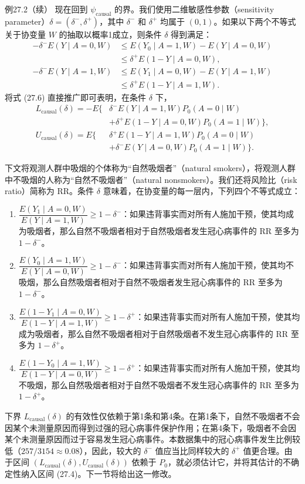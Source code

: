\begin{bookresult}{例}{27.2（续）}
现在回到 $\psi_{\mathrm{causal}}$ 的界。我们使用二维敏感性参数（sensitivity parameter）$\delta=(\delta^-,\delta^+)$，其中 $\delta^-$ 和 $\delta^+$ 均属于 $(0,1)$。如果以下两个不等式关于协变量 $W$ 的抽取以概率1成立，则条件 $\delta$ 得到满足：
\[
 \begin{aligned}
 -\delta^-E(Y\mid A=0,W)
 &\leq E(Y_0\mid A=1,W)-E(Y\mid A=0,W)\\
 &\leq\delta^+E(1-Y\mid A=0,W),\\[2pt]
 -\delta^-E(Y\mid A=1,W)
 &\leq E(Y_1\mid A=0,W)-E(Y\mid A=1,W)\\
 &\leq\delta^+E(1-Y\mid A=1,W).
 \end{aligned}
\]
将式 (27.6) 直接推广即可表明，在条件 $\delta$ 下，
\begin{equation}
 \begin{aligned}
 L_{\mathrm{causal}}(\delta)=-E\bigl\{&\delta^-E(Y\mid A=1,W)P_0(A=0\mid W)\\
 &+\delta^+E(1-Y\mid A=0,W)P_0(A=1\mid W)\bigr\},\\
 U_{\mathrm{causal}}(\delta)=E\bigl\{&\delta^+E(1-Y\mid A=1,W)P_0(A=0\mid W)\\
 &+\delta^-E(Y\mid A=0,W)P_0(A=1\mid W)\bigr\}.
 \end{aligned}
 \tag{27.7}
\end{equation}

下文将观测人群中吸烟的个体称为“自然吸烟者”（natural smokers），将观测人群中不吸烟的人称为“自然不吸烟者”（natural nonsmokers）。我们还将风险比（risk ratio）简称为 RR。条件 $\delta$ 意味着，在协变量的每一层内，下列四个不等式成立：
\begin{enumerate}
\item $\dfrac{E(Y_1\mid A=0,W)}{E(Y\mid A=1,W)}\geq1-\delta^-$：如果违背事实而对所有人施加干预，使其均成为吸烟者，那么自然不吸烟者相对于自然吸烟者发生冠心病事件的 RR 至多为 $1-\delta^-$。
\item $\dfrac{E(Y_0\mid A=1,W)}{E(Y\mid A=0,W)}\geq1-\delta^-$：如果违背事实而对所有人施加干预，使其均不吸烟，那么自然吸烟者相对于自然不吸烟者发生冠心病事件的 RR 至多为 $1-\delta^-$。
\item $\dfrac{E(1-Y_1\mid A=0,W)}{E(1-Y\mid A=1,W)}\geq1-\delta^+$：如果违背事实而对所有人施加干预，使其均成为吸烟者，那么自然不吸烟者相对于自然吸烟者不发生冠心病事件的 RR 至多为 $1-\delta^+$。
\item $\dfrac{E(1-Y_0\mid A=1,W)}{E(1-Y\mid A=0,W)}\geq1-\delta^+$：如果违背事实而对所有人施加干预，使其均不吸烟，那么自然吸烟者相对于自然不吸烟者不发生冠心病事件的 RR 至多为 $1-\delta^+$。
\end{enumerate}
下界 $L_{\mathrm{causal}}(\delta)$ 的有效性仅依赖于第1条和第4条。在第1条下，自然不吸烟者不会因某个未测量原因而得到过强的冠心病事件保护作用；在第4条下，吸烟者不会因某个未测量原因而过于容易发生冠心病事件。本数据集中的冠心病事件发生比例较低（$257/3154\approx0.08$），因此，较大的 $\delta^-$ 值应当比同样较大的 $\delta^+$ 值更合理。由于区间 $(L_{\mathrm{causal}}(\delta),U_{\mathrm{causal}}(\delta))$ 依赖于 $P_0$，就必须估计它，并将其估计的不确定性纳入区间 (27.4)。下一节将给出这一修改。
\end{bookresult}
